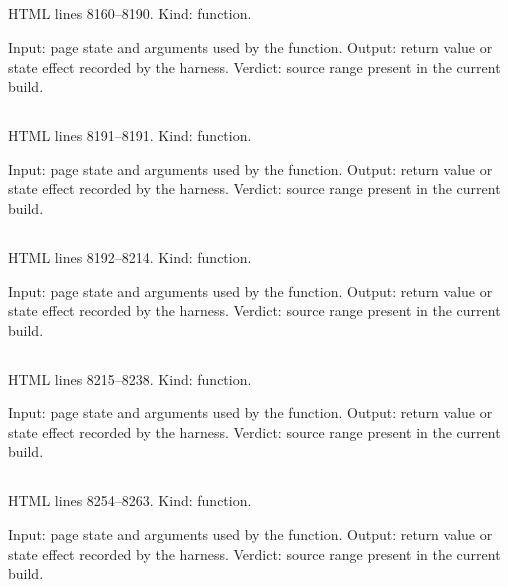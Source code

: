 \subsection*{\texttt{}}
\label{vf_441_wellRows}
HTML lines 8160--8190. Kind: function.

Input: page state and arguments used by the function.
Output: return value or state effect recorded by the harness.
Verdict: source range present in the current build.

\subsection*{\texttt{}}
\label{vf_442_allWellRows}
HTML lines 8191--8191. Kind: function.

Input: page state and arguments used by the function.
Output: return value or state effect recorded by the harness.
Verdict: source range present in the current build.

\subsection*{\texttt{}}
\label{vf_443_tmRows}
HTML lines 8192--8214. Kind: function.

Input: page state and arguments used by the function.
Output: return value or state effect recorded by the harness.
Verdict: source range present in the current build.

\subsection*{\texttt{}}
\label{vf_444_metaRows}
HTML lines 8215--8238. Kind: function.

Input: page state and arguments used by the function.
Output: return value or state effect recorded by the harness.
Verdict: source range present in the current build.

\subsection*{\texttt{}}
\label{vf_445_dyeChemistryOf}
HTML lines 8254--8263. Kind: function.

Input: page state and arguments used by the function.
Output: return value or state effect recorded by the harness.
Verdict: source range present in the current build.

